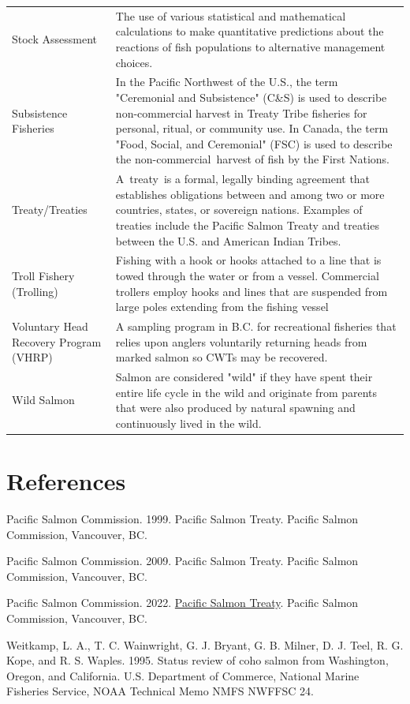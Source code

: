 \documentclass[
  letterpaper,
  DIV=11,
  numbers=noendperiod]{scrartcl}
\newlength{\cslhangindent}
\newenvironment{CSLReferences}[2] %
 {\begin{list}{}{%
  \setlength{\itemindent}{0pt}
  \setlength{\leftmargin}{0pt}
  \setlength{\parsep}{0pt}
  \ifodd #1
   \setlength{\leftmargin}{\cslhangindent}
   \setlength{\itemindent}{-1\cslhangindent}
  \fi
  \setlength{\itemsep}{#2\baselineskip}}}
 {\end{list}}
\begin{document}
\begin{table}
\begin{tabular*}{\linewidth}{@{\extracolsep{\fill}}ll}
Stock Assessment & The use of various statistical and mathematical calculations to make quantitative predictions about the reactions of fish populations to alternative management choices. \\ 
Subsistence Fisheries & In the Pacific Northwest of the U.S., the term "Ceremonial and Subsistence" (C\&S) is used to describe non-commercial harvest in Treaty Tribe fisheries for personal, ritual, or community use. In Canada, the term "Food, Social, and Ceremonial" (FSC) is used to describe the non-commercial harvest of fish by the First Nations. \\ 
Treaty/Treaties & A treaty is a formal, legally binding agreement that establishes obligations between and among two or more countries, states, or sovereign nations. Examples of treaties include the Pacific Salmon Treaty and treaties between the U.S. and American Indian Tribes. \\ 
Troll Fishery (Trolling) & Fishing with a hook or hooks attached to a line that is towed through the water or from a vessel. Commercial trollers employ hooks and lines that are suspended from large poles extending from the fishing vessel \\ 
Voluntary Head Recovery Program (VHRP) & A sampling program in B.C. for recreational fisheries that relies upon anglers voluntarily returning heads from marked salmon so CWTs may be recovered. \\ 
Wild Salmon & Salmon are considered "wild" if they have spent their entire life cycle in the wild and originate from parents that were also produced by natural spawning and continuously lived in the wild. \\ 
\bottomrule
\end{tabular*}
\end{table}

\section{References}\label{references}

\label{refs}
\begin{CSLReferences}{1}{0}
Pacific Salmon Commission. 1999. {Pacific Salmon Treaty}. Pacific Salmon
Commission, Vancouver, BC.

Pacific Salmon Commission. 2009. {Pacific Salmon Treaty}. Pacific Salmon
Commission, Vancouver, BC.

Pacific Salmon Commission. 2022.
\href{https://www.psc.org/publications/pacific-salmon-treaty/}{{Pacific
Salmon Treaty}}. Pacific Salmon Commission, Vancouver, BC.

Weitkamp, L. A., T. C. Wainwright, G. J. Bryant, G. B. Milner, D. J.
Teel, R. G. Kope, and R. S. Waples. 1995. {Status review of coho salmon
from Washington, Oregon, and California}. U.S. Department of Commerce,
National Marine Fisheries Service, NOAA Technical Memo NMFS NWFFSC 24.

\end{CSLReferences}
\end{document}
